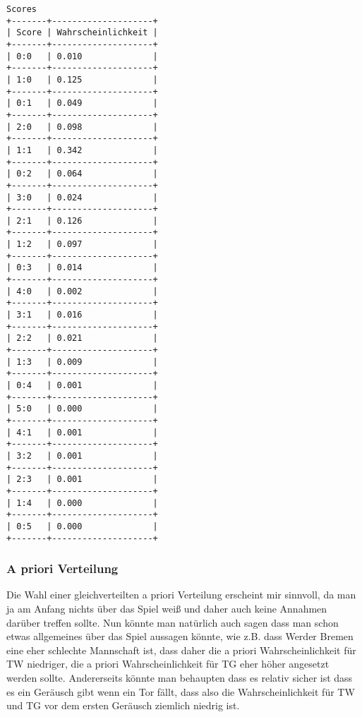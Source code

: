 \documentclass[a4paper]{article}
\begin{document}
\begin{lstlisting}
Scores
+-------+--------------------+
| Score | Wahrscheinlichkeit |
+-------+--------------------+
| 0:0   | 0.010              |
+-------+--------------------+
| 1:0   | 0.125              |
+-------+--------------------+
| 0:1   | 0.049              |
+-------+--------------------+
| 2:0   | 0.098              |
+-------+--------------------+
| 1:1   | 0.342              |
+-------+--------------------+
| 0:2   | 0.064              |
+-------+--------------------+
| 3:0   | 0.024              |
+-------+--------------------+
| 2:1   | 0.126              |
+-------+--------------------+
| 1:2   | 0.097              |
+-------+--------------------+
| 0:3   | 0.014              |
+-------+--------------------+
| 4:0   | 0.002              |
+-------+--------------------+
| 3:1   | 0.016              |
+-------+--------------------+
| 2:2   | 0.021              |
+-------+--------------------+
| 1:3   | 0.009              |
+-------+--------------------+
| 0:4   | 0.001              |
+-------+--------------------+
| 5:0   | 0.000              |
+-------+--------------------+
| 4:1   | 0.001              |
+-------+--------------------+
| 3:2   | 0.001              |
+-------+--------------------+
| 2:3   | 0.001              |
+-------+--------------------+
| 1:4   | 0.000              |
+-------+--------------------+
| 0:5   | 0.000              |
+-------+--------------------+
\end{lstlisting}

\subsubsection{A priori Verteilung}
Die Wahl einer gleichverteilten a priori Verteilung erscheint mir sinnvoll, da man ja am Anfang nichts über das Spiel weiß und daher auch keine Annahmen darüber treffen sollte. Nun könnte man natürlich auch sagen dass man schon etwas allgemeines über das Spiel aussagen könnte, wie z.B. dass Werder Bremen eine eher schlechte Mannschaft ist, dass daher die a priori Wahrscheinlichkeit für TW niedriger, die a priori Wahrscheinlichkeit für TG eher höher angesetzt werden sollte. Andererseits könnte man behaupten dass es relativ sicher ist dass es ein Geräusch gibt wenn ein Tor fällt, dass also die Wahrscheinlichkeit für TW und TG vor dem ersten Geräusch ziemlich niedrig ist. 
\end{document}

